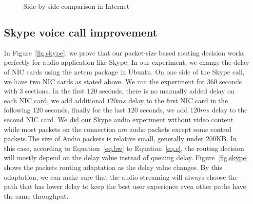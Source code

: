 \begin{figure}[htb]
\caption{Side-by-side comparison in Internet}
\label{fig.net}
\end{figure}


\subsection{Skype voice call improvement}
\label{sec:skype}

In Figure~\ref{fig.skype}, we prove that our packet-size based routing decision works perfectly for audio application like Skype. In our experiment, we change the delay of NIC cards using the netem package in Ubuntu. On one side of the Skype call, we have two NIC cards as stated above. We ran the experiment for $360$ seconds with $3$ sections. In the first $120$ seconds, there is no manually added delay on each NIC card, we add additional $120ms$ delay to the first NIC card in the following $120$ seconds, finally for the last $120$ seconds, we add $120ms$ delay to the second NIC card. We did our Skype audio experiment without video content while most packets on the connection are audio packets except some control packets.The size of Audio packets is relative small, generally under $200$KB. In this case, according to Equation~\ref{eq.bw} to Equation~\ref{eq.c}, the routing decision will mostly depend on the delay value instead of queuing delay. Figure~\ref{fig.skype} shows the packets routing adaptation as the delay value changes. By this adaptation, we can make sure that the audio streaming will always choose the path that has lower delay to keep the best user experience even other paths have the same throughput.

